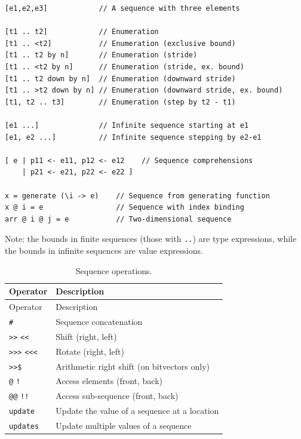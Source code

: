 \begin{verbatim}
[e1,e2,e3]            // A sequence with three elements

[t1 .. t2]            // Enumeration
[t1 .. <t2]           // Enumeration (exclusive bound)
[t1 .. t2 by n]       // Enumeration (stride)
[t1 .. <t2 by n]      // Enumeration (stride, ex. bound)
[t1 .. t2 down by n]  // Enumeration (downward stride)
[t1 .. >t2 down by n] // Enumeration (downward stride, ex. bound)
[t1, t2 .. t3]        // Enumeration (step by t2 - t1)

[e1 ...]              // Infinite sequence starting at e1
[e1, e2 ...]          // Infinite sequence stepping by e2-e1

[ e | p11 <- e11, p12 <- e12    // Sequence comprehensions
    | p21 <- e21, p22 <- e22 ]

x = generate (\i -> e)    // Sequence from generating function
x @ i = e                 // Sequence with index binding
arr @ i @ j = e           // Two-dimensional sequence
\end{verbatim}

Note: the bounds in finite sequences (those with \texttt{..}) are type
expressions, while the bounds in infinite sequences are value
expressions.

\begin{longtable}[]{@{}ll@{}}
\caption{Sequence operations.}\tabularnewline
\toprule
Operator & Description \\
\midrule
\endfirsthead
\toprule
Operator & Description \\
\midrule
\endhead
\texttt{\#} & Sequence concatenation \\
\texttt{\textgreater{}\textgreater{}} \texttt{\textless{}\textless{}} &
Shift (right, left) \\
\texttt{\textgreater{}\textgreater{}\textgreater{}}
\texttt{\textless{}\textless{}\textless{}} & Rotate (right, left) \\
\texttt{\textgreater{}\textgreater{}\$} & Arithmetic right shift (on
bitvectors only) \\
\texttt{@} \texttt{!} & Access elements (front, back) \\
\texttt{@@} \texttt{!!} & Access sub-sequence (front, back) \\
\texttt{update} & Update the value of a sequence at a
location \\
\texttt{updates} & Update multiple values of a
sequence \\
\bottomrule
\end{longtable}

